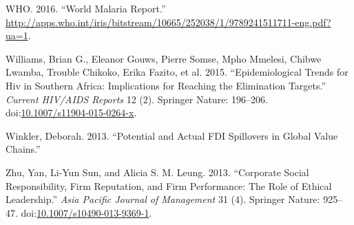 \documentclass[]{article}
\begin{document}
\hypertarget{ref-World2016}{}
WHO. 2016. ``World Malaria Report.''
\url{http://apps.who.int/iris/bitstream/10665/252038/1/9789241511711-eng.pdf?ua=1}.

\hypertarget{ref-Williams_2015}{}
Williams, Brian G., Eleanor Gouws, Pierre Somse, Mpho Mmelesi, Chibwe
Lwamba, Trouble Chikoko, Erika Fazito, et al. 2015. ``Epidemiological
Trends for Hiv in Southern Africa: Implications for Reaching the
Elimination Targets.'' \emph{Current HIV/AIDS Reports} 12 (2). Springer
Nature: 196--206.
doi:\href{https://doi.org/10.1007/s11904-015-0264-x}{10.1007/s11904-015-0264-x}.

\hypertarget{ref-Winkler}{}
Winkler, Deborah. 2013. ``Potential and Actual FDI Spillovers in Global
Value Chains.''

\hypertarget{ref-Zhu_2013}{}
Zhu, Yan, Li-Yun Sun, and Alicia S. M. Leung. 2013. ``Corporate Social
Responsibility, Firm Reputation, and Firm Performance: The Role of
Ethical Leadership.'' \emph{Asia Pacific Journal of Management} 31 (4).
Springer Nature: 925--47.
doi:\href{https://doi.org/10.1007/s10490-013-9369-1}{10.1007/s10490-013-9369-1}.
\end{document}
